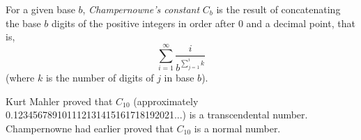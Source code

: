 \documentclass[12pt]{article}
\begin{document}
For a given base $b$, {\em Champernowne's constant} $C_b$ is the result of concatenating the base $b$ digits of the positive integers in order after 0 and a decimal point, that is, $$\sum_{i = 1}^\infty \frac{i}{b^{\sum_{j = 1}^i k}}$$ (where $k$ is the number of digits of $j$ in base $b$).

Kurt Mahler proved that $C_{10}$ (approximately 0.123456789101112131415161718192021...) is a transcendental number. Champernowne had earlier proved that $C_{10}$ is a normal number.
\end{document}
